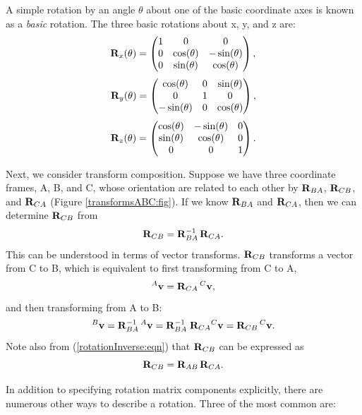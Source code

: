 A simple rotation by an angle $\theta$ about one of the basic
coordinate axes is known as a {\it basic} rotation. The three
basic rotations about x, y, and z are:
%
\begin{equation*}
{\bf R}_x(\theta) = \left(\begin{matrix} 1 & 0 & 0 \\ 
               0 & \cos(\theta) & -\sin(\theta) \\ 
               0 & \sin(\theta) & \cos(\theta) 
		 \end{matrix}\right),
\end{equation*}
%
\begin{equation*}
{\bf R}_y(\theta) = \left(\begin{matrix} \cos(\theta) & 0 & \sin(\theta) \\ 
               0 & 1 & 0 \\ 
               -\sin(\theta) & 0 & \cos(\theta) 
                 \end{matrix}\right),
\end{equation*}
%
\begin{equation*}
{\bf R}_z(\theta) = \left(\begin{matrix} \cos(\theta) & -\sin(\theta) & 0 \\ 
               \sin(\theta) & \cos(\theta) & 0 \\ 
               0 & 0 & 1 
                 \end{matrix}\right).
\label{elementaryRotations:sec}
\end{equation*}
%

Next, we consider transform composition. Suppose we have three
coordinate frames, A, B, and C, whose orientation are related to each other by
${\bf R}_{BA}$, ${\bf R}_{CB}$, and ${\bf R}_{CA}$ (Figure
\ref{transformsABC:fig}).  If we know ${\bf R}_{BA}$ and ${\bf R}_{CA}$,
then we can determine ${\bf R}_{CB}$ from
%
\begin{equation}
{\bf R}_{CB} = {\bf R}_{BA}^{-1} \, {\bf R}_{CA}.
\label{rotationCB:eqn}
\end{equation}
%
This can be understood in terms of vector transforms. ${\bf R}_{CB}$
transforms a vector from C to B, which is equivalent to first
transforming from C to A,
%
\begin{equation}
{}^A{\bf v} = {\bf R}_{CA} \, {}^C{\bf v},
\end{equation}
%
and then transforming from A to B:
%
\begin{equation}
{}^B{\bf v} = {\bf R}_{BA}^{-1} \, {}^A{\bf v} = {\bf R}_{BA}^{-1} \; {\bf R}_{CA} {}^C{\bf v} = {\bf R}_{CB} \, {}^C{\bf v}.
\end{equation}
%
Note also from (\ref{rotationInverse:eqn}) that ${\bf R}_{CB}$ can be 
expressed as
%
\begin{equation}
{\bf R}_{CB} = {\bf R}_{AB} \, {\bf R}_{CA}.
\label{rotationCBII:eqn}
\end{equation}
%

In addition to specifying rotation matrix components explicitly,
there are numerous other ways to describe a rotation.
Three of the most common are:

